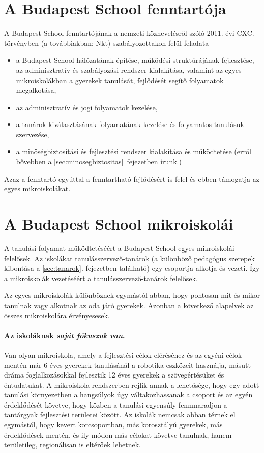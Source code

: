   \section{A Budapest School fenntartója}
  A Budapest School fenntartójának a nemzeti köznevelésről szóló 2011. évi CXC. törvényben (a továbbiakban: Nkt)  szabályozottakon felül feladata
  \begin{itemize}
  \item a Budapest School hálózatának építése, működési struktúrájának
  fejlesztése, az adminisztratív és szabályozási rendszer kialakítása,
  valamint az egyes mikroiskolákban a gyerekek tanulását, fejlődését segítő folyamatok megalkotása,
  \item  az adminisztratív és jogi folyamatok kezelése,
  \item  a tanárok kiválasztásának folyamatának kezelése és folyamatos tanulásuk szervezése,
  \item a minőségbiztosítási és fejlesztési rendszer kialakítása és működtetése (erről bővebben a \ref{sec:minosegbiztositas}~fejezetben írunk.)
\end{itemize}

 Azaz a fenntartó egyúttal a fenntartható fejlődésért is felel és ebben támogatja az egyes mikroiskolákat.

  \section{A Budapest School mikroiskolái}

  A tanulási folyamat működtetéséért a Budapest School egyes mikroiskolái
  felelősek. Az iskolákat tanulásszervező-tanárok (a különböző pedagógus szerepek kibontása a \ref{sec:tanarok}. fejezetben található) egy csoportja alkotja és vezeti. Így a
  mikroiskolák vezetéséért a tanulásszervező-tanárok felelősek.

  Az egyes mikroiskolák különböznek egymástól abban, hogy pontosan mit és mikor
  tanulnak vagy alkotnak az oda járó gyerekek. Azonban a következő alapelvek az összes mikroiskolára
  érvényesesek.

\paragraph{Az iskoláknak \emph{saját fókuszuk van}.}

    Van olyan mikroiskola, amely a fejlesztési célok eléréséhez és az egyéni célok
    mentén már 6 éves gyerekek tanulásánál a robotika eszközeit használja,
    másutt dráma foglalkozásokkal fejlesztik 12 éves gyerekek a szövegértésüket és
    éntudatukat. A
    mikroiskola-rendszerben rejlik annak a lehetősége, hogy egy adott tanulási
    környezetben a hangsúlyok úgy váltakozhassanak a csoport és az egyén
    érdeklődését követve, hogy közben a tanulási egyensúly fennmaradjon a
    tantárgyak fejlesztési területei között. Az iskolák nemcsak abban térnek el
    egymástól, hogy kevert korcsoportban, más korosztályú gyerekek, más
    érdeklődések mentén, és ily módon más célokat követve tanulnak, hanem
    területileg, regionálisan is eltérőek lehetnek.


